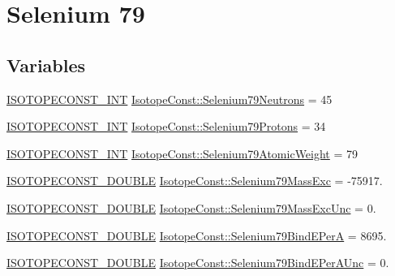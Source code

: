 \hypertarget{group___isotope_const-_selenium-_se79}{}\section{Selenium 79}
\label{group___isotope_const-_selenium-_se79}
\subsection*{Variables}
\begin{DoxyCompactItemize}
\item 
\mbox{\hyperlink{group___isotope_const-_macros_ga5f18360b3e99483a35c32d789e62621c}{I\+S\+O\+T\+O\+P\+E\+C\+O\+N\+S\+T\+\_\+\+I\+NT}} \mbox{\hyperlink{group___isotope_const-_selenium-_se79_ga8207b723734dcbbeea2bebcfa750ccce}{Isotope\+Const\+::\+Selenium79\+Neutrons}} = 45
\item 
\mbox{\hyperlink{group___isotope_const-_macros_ga5f18360b3e99483a35c32d789e62621c}{I\+S\+O\+T\+O\+P\+E\+C\+O\+N\+S\+T\+\_\+\+I\+NT}} \mbox{\hyperlink{group___isotope_const-_selenium-_se79_ga235080e16eaad1d0ffcbd56a8988637a}{Isotope\+Const\+::\+Selenium79\+Protons}} = 34
\item 
\mbox{\hyperlink{group___isotope_const-_macros_ga5f18360b3e99483a35c32d789e62621c}{I\+S\+O\+T\+O\+P\+E\+C\+O\+N\+S\+T\+\_\+\+I\+NT}} \mbox{\hyperlink{group___isotope_const-_selenium-_se79_gae9ee15cfff5c3bfa33f2123eeff725ce}{Isotope\+Const\+::\+Selenium79\+Atomic\+Weight}} = 79
\item 
\mbox{\hyperlink{group___isotope_const-_macros_ga8f45a7272ce02c0b4c65c44636ed719a}{I\+S\+O\+T\+O\+P\+E\+C\+O\+N\+S\+T\+\_\+\+D\+O\+U\+B\+LE}} \mbox{\hyperlink{group___isotope_const-_selenium-_se79_gaecb3913d340bd2792f52a3fb491c5338}{Isotope\+Const\+::\+Selenium79\+Mass\+Exc}} = -\/75917.
\item 
\mbox{\hyperlink{group___isotope_const-_macros_ga8f45a7272ce02c0b4c65c44636ed719a}{I\+S\+O\+T\+O\+P\+E\+C\+O\+N\+S\+T\+\_\+\+D\+O\+U\+B\+LE}} \mbox{\hyperlink{group___isotope_const-_selenium-_se79_gaaece43a67be44ca6fa4d640f7401e259}{Isotope\+Const\+::\+Selenium79\+Mass\+Exc\+Unc}} = 0.
\item 
\mbox{\hyperlink{group___isotope_const-_macros_ga8f45a7272ce02c0b4c65c44636ed719a}{I\+S\+O\+T\+O\+P\+E\+C\+O\+N\+S\+T\+\_\+\+D\+O\+U\+B\+LE}} \mbox{\hyperlink{group___isotope_const-_selenium-_se79_gab880ba9928fb274d34779e7b46584bb8}{Isotope\+Const\+::\+Selenium79\+Bind\+E\+PerA}} = 8695.
\item 
\mbox{\hyperlink{group___isotope_const-_macros_ga8f45a7272ce02c0b4c65c44636ed719a}{I\+S\+O\+T\+O\+P\+E\+C\+O\+N\+S\+T\+\_\+\+D\+O\+U\+B\+LE}} \mbox{\hyperlink{group___isotope_const-_selenium-_se79_ga7a3254cdda87adcdee6bf1a219fd94fe}{Isotope\+Const\+::\+Selenium79\+Bind\+E\+Per\+A\+Unc}} = 0.

\end{DoxyCompactItemize}
